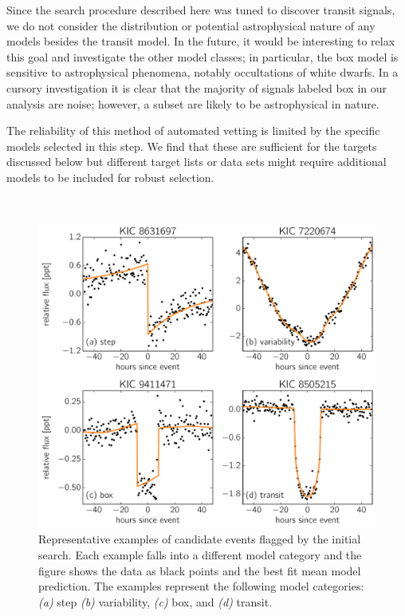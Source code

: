 \documentclass[manuscript, letterpaper]{aastex6}
\newcommand{\dfmfiglabel}[1]{\label{fig:#1}}
\newcommand{\modelname}[1]{{\textsf{#1}}}
\begin{document}
Since the search procedure described here was tuned to discover transit
signals, we do not consider the distribution or potential astrophysical nature
of any models besides the \modelname{transit} model.
In the future, it would be interesting to relax this goal and investigate the
other model classes; in particular, the \modelname{box} model is
sensitive to astrophysical phenomena, notably occultations of white dwarfs.
In a cursory investigation it is clear that the majority of signals labeled
\modelname{box} in our analysis are noise; however, a subset are likely to be
astrophysical in nature.

The reliability of this method of automated vetting is limited by the specific
models selected in this step.
We find that these are sufficient for the targets discussed below but
different target lists or data sets might require additional models to be
included for robust selection.

\begin{figure}[p]~\\
\begin{center}
\includegraphics[width=\textwidth]{figures/model_comp.pdf}
\end{center}
\caption{%
Representative examples of candidate events flagged by the initial search.
Each example falls into a different model category and the figure shows the
data as black points and the best fit mean model prediction.
The examples represent the following model categories:
\emph{(a)} step \emph{(b)} variability, \emph{(c)} box, and \emph{(d)}
transit.
\dfmfiglabel{model-comp}}
\end{figure}
\end{document}
